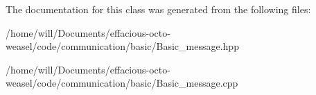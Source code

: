The documentation for this class was generated from the following files\+:\begin{DoxyCompactItemize}
\item 
/home/will/\+Documents/effacious-\/octo-\/weasel/code/communication/basic/Basic\+\_\+message.\+hpp\item 
/home/will/\+Documents/effacious-\/octo-\/weasel/code/communication/basic/Basic\+\_\+message.\+cpp\end{DoxyCompactItemize}
